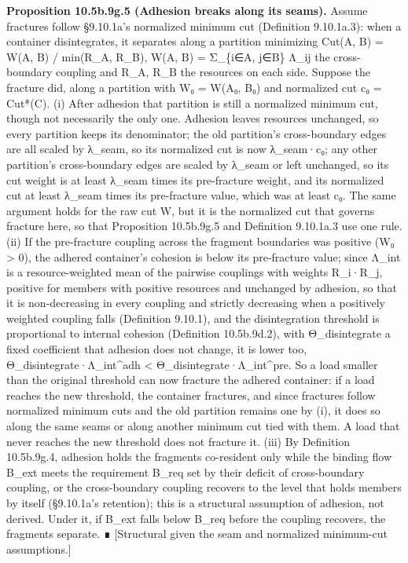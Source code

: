 \documentclass[
]{article}
\begin{document}
\textbf{Proposition 10.5b.9g.5 (Adhesion breaks along its seams).}
Assume fractures follow §9.10.1a's normalized minimum cut (Definition
9.10.1a.3): when a container disintegrates, it separates along a
partition minimizing Cut(A, B) = W(A, B) / min(R\_A, R\_B), W(A, B) =
Σ\_\{i∈A, j∈B\} Λ\_ij the cross-boundary coupling and R\_A, R\_B the
resources on each side. Suppose the fracture did, along a partition with
W₀ = W(A₀, B₀) and normalized cut c₀ = Cut*(C). (i) After adhesion that
partition is still a normalized minimum cut, though not necessarily the
only one. Adhesion leaves resources unchanged, so every partition keeps
its denominator; the old partition's cross-boundary edges are all scaled
by λ\_seam, so its normalized cut is now λ\_seam·c₀; any other
partition's cross-boundary edges are scaled by λ\_seam or left
unchanged, so its cut weight is at least λ\_seam times its pre-fracture
weight, and its normalized cut at least λ\_seam times its pre-fracture
value, which was at least c₀. The same argument holds for the raw cut W,
but it is the normalized cut that governs fracture here, so that
Proposition 10.5b.9g.5 and Definition 9.10.1a.3 use one rule. (ii) If
the pre-fracture coupling across the fragment boundaries was positive
(W₀ \textgreater{} 0), the adhered container's cohesion is below its
pre-fracture value; since Λ\_int is a resource-weighted mean of the
pairwise couplings with weights R\_i·R\_j, positive for members with
positive resources and unchanged by adhesion, so that it is
non-decreasing in every coupling and strictly decreasing when a
positively weighted coupling falls (Definition 9.10.1), and the
disintegration threshold is proportional to internal cohesion
(Definition 10.5b.9d.2), with Θ\_disintegrate a fixed coefficient that
adhesion does not change, it is lower too, Θ\_disintegrate·Λ\_int\^{}adh
\textless{} Θ\_disintegrate·Λ\_int\^{}pre. So a load smaller than the
original threshold can now fracture the adhered container: if a load
reaches the new threshold, the container fractures, and since fractures
follow normalized minimum cuts and the old partition remains one by (i),
it does so along the same seams or along another minimum cut tied with
them. A load that never reaches the new threshold does not fracture it.
(iii) By Definition 10.5b.9g.4, adhesion holds the fragments co-resident
only while the binding flow B\_ext meets the requirement B\_req set by
their deficit of cross-boundary coupling, or the cross-boundary coupling
recovers to the level that holds members by itself (§9.10.1a's
retention); this is a structural assumption of adhesion, not derived.
Under it, if B\_ext falls below B\_req before the coupling recovers, the
fragments separate. ∎ {[}Structural given the seam and normalized
minimum-cut assumptions.{]}
\end{document}
